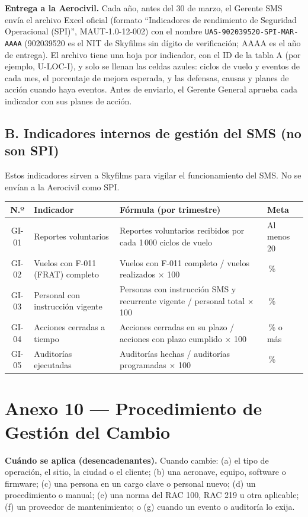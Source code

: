 \textbf{Entrega a la Aerocivil.} Cada año, antes del 30 de marzo, el Gerente SMS envía el archivo Excel oficial (formato ``Indicadores de rendimiento de Seguridad Operacional (SPI)'', MAUT-1.0-12-002) con el nombre \texttt{UAS-902039520-SPI-MAR-AAAA} (902039520 es el NIT de Skyfilms sin dígito de verificación; AAAA es el año de entrega). El archivo tiene una hoja por indicador, con el ID de la tabla A (por ejemplo, U-LOC-I), y solo se llenan las celdas azules: ciclos de vuelo y eventos de cada mes, el porcentaje de mejora esperada, y las defensas, causas y planes de acción cuando haya eventos. Antes de enviarlo, el Gerente General aprueba cada indicador con sus planes de acción.

\subsection*{B. Indicadores internos de gestión del SMS (no son SPI)}
Estos indicadores sirven a Skyfilms para vigilar el funcionamiento del SMS. No se envían a la Aerocivil como SPI.
\begin{longtable}{|c|>{\RaggedRight\arraybackslash}p{3.6cm}|>{\RaggedRight\arraybackslash}p{6cm}|>{\RaggedRight\arraybackslash}p{2.8cm}|}
\hline
\rowcolor[gray]{0.9}\textbf{N.º} & \textbf{Indicador} & \textbf{Fórmula (por trimestre)} & \textbf{Meta} \\ \hline
\endhead
GI-01 & Reportes voluntarios & Reportes voluntarios recibidos por cada 1\,000 ciclos de vuelo & Al menos 20 \\ \hline
GI-02 & Vuelos con F-011 (FRAT) completo & Vuelos con F-011 completo / vuelos realizados $\times$ 100 & 100\,\% \\ \hline
GI-03 & Personal con instrucción vigente & Personas con instrucción SMS y recurrente vigente / personal total $\times$ 100 & 100\,\% \\ \hline
GI-04 & Acciones cerradas a tiempo & Acciones cerradas en su plazo / acciones con plazo cumplido $\times$ 100 & 90\,\% o más \\ \hline
GI-05 & Auditorías ejecutadas & Auditorías hechas / auditorías programadas $\times$ 100 & 100\,\% \\ \hline
\end{longtable}

\clearpage
\section*{Anexo 10 --- Procedimiento de Gestión del Cambio}
\textbf{Cuándo se aplica (desencadenantes).} Cuando cambie: (a) el tipo de operación, el sitio, la ciudad o el cliente; (b) una aeronave, equipo, software o firmware; (c) una persona en un cargo clave o personal nuevo; (d) un procedimiento o manual; (e) una norma del RAC 100, RAC 219 u otra aplicable; (f) un proveedor de mantenimiento; o (g) cuando un evento o auditoría lo exija.

